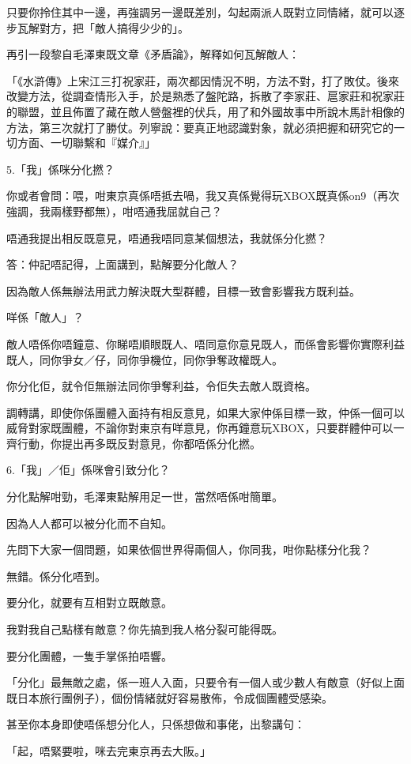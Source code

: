 只要你拎住其中一邊，再強調另一邊既差別，勾起兩派人既對立同情緒，就可以逐步瓦解對方，把「敵人搞得少少的」。

再引一段黎自毛澤東既文章《矛盾論》，解釋如何瓦解敵人：

「《水滸傳》上宋江三打祝家莊，兩次都因情況不明，方法不對，打了敗仗。後來改變方法，從調查情形入手，於是熟悉了盤陀路，拆散了​​李家莊、扈家莊和祝家莊的聯盟，並且佈置了藏在敵人營盤裡的伏兵，用了和外國故事中所說木馬計相像的方法，第三次就打了勝仗。列寧說：要真正地認識對象，就必須把握和研究它的一切方面、一切聯繫和『媒介』」

5.「我」係咪分化撚？

你或者會問：喂，咁東京真係唔抵去喎，我又真係覺得玩XBOX既真係on9（再次強調，我兩樣野都無），咁唔通我屈就自己？

唔通我提出相反既意見，唔通我唔同意某個想法，我就係分化撚？

答：仲記唔記得，上面講到，點解要分化敵人？

因為敵人係無辦法用武力解決既大型群體，目標一致會影響我方既利益。

咩係「敵人」？

敵人唔係你唔鐘意、你睇唔順眼既人、唔同意你意見既人，而係會影響你實際利益既人，同你爭女／仔，同你爭機位，同你爭奪政權既人。

你分化佢，就令佢無辦法同你爭奪利益，令佢失去敵人既資格。

調轉講，即使你係團體入面持有相反意見，如果大家仲係目標一致，仲係一個可以威脅對家既團體，不論你對東京有咩意見，你再鐘意玩XBOX，只要群體仲可以一齊行動，你提出再多既反對意見，你都唔係分化撚。

6.「我」／佢」係咪會引致分化？

分化點解咁勁，毛澤東點解用足一世，當然唔係咁簡單。

因為人人都可以被分化而不自知。

先問下大家一個問題，如果依個世界得兩個人，你同我，咁你點樣分化我？

無錯。係分化唔到。

要分化，就要有互相對立既敵意。

我對我自己點樣有敵意？你先搞到我人格分裂可能得既。

要分化團體，一隻手掌係拍唔響。

「分化」最無敵之處，係一班人入面，只要令有一個人或少數人有敵意（好似上面既日本旅行團例子），個份情緒就好容易散佈，令成個團體受感染。

甚至你本身即使唔係想分化人，只係想做和事佬，出黎講句：

「起，唔緊要啦，咪去完東京再去大阪。」

